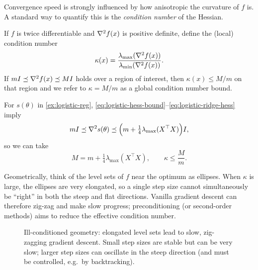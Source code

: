 Convergence speed is strongly influenced by how anisotropic the curvature of $f$ is.
A standard way to quantify this is the \emph{condition number} of the Hessian.

\begin{definition}
If $f$ is twice differentiable and $\nabla^2 f(x)$ is positive definite, define the (local) condition number
\begin{equation}
  \kappa(x) = \frac{\lambda_{\max}(\nabla^2 f(x))}{\lambda_{\min}(\nabla^2 f(x))}.
  \label{eq:condition-number-local}
\end{equation}
If $mI \preceq \nabla^2 f(x) \preceq MI$ holds over a region of interest, then $\kappa(x)\le M/m$ on that region and we refer to $\kappa = M/m$ as a global condition number bound.
\end{definition}

\begin{example}
For $s(\theta)$ in \cref{ex:logistic-reg}, \eqref{eq:logistic-hess-bound}--\eqref{eq:logistic-ridge-hess} imply
\[
  mI \preceq \nabla^2 s(\theta) \preceq \Bigl(m + \tfrac14 \lambda_{\max}(X^\top X)\Bigr) I,
\]
so we can take
\[
  M = m + \tfrac14 \lambda_{\max}(X^\top X),
  \qquad
  \kappa \le \frac{M}{m}.
\]
\end{example}

Geometrically, think of the level sets of $f$ near the optimum as ellipses.
When $\kappa$ is large, the ellipses are very elongated, so a single step size cannot simultaneously be ``right'' in both the steep and flat directions.
Vanilla gradient descent can therefore zig-zag and make slow progress; preconditioning (or second-order methods) aims to reduce the effective condition number.

\begin{figure}[t]
  \centering
  
  \caption{Ill-conditioned geometry: elongated level sets lead to slow, zig-zagging gradient descent.
  Small step sizes are stable but can be very slow; larger step sizes can oscillate in the steep direction (and must be controlled, e.g.\ by backtracking).}
  \label{fig:ill-conditioned-gd}
\end{figure}
